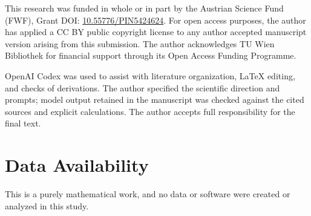 \documentclass[aps,pra,reprint,superscriptaddress,amsmath,amssymb,floatfix]{revtex4-2}
\theoremstyle{plain}
\theoremstyle{definition}
\theoremstyle{remark}
\begin{document}
\begin{acknowledgments}
This research was funded in whole or in part by the Austrian Science Fund
(FWF), Grant DOI: \href{https://doi.org/10.55776/PIN5424624}{10.55776/PIN5424624}. For open access purposes, the author
has applied a CC BY public copyright license to any author accepted manuscript
version arising from this submission. The author acknowledges TU Wien
Bibliothek for financial support through its Open Access Funding Programme.

OpenAI Codex was used to assist with literature organization, LaTeX
editing, and checks of derivations. The author specified the scientific
direction and prompts; model output retained in the manuscript was checked
against the cited sources and explicit calculations. The author accepts full
responsibility for the final text.
\end{acknowledgments}

\section*{Data Availability}
This is a purely mathematical work, and no data or software were created or
analyzed in this study.



\end{document}
